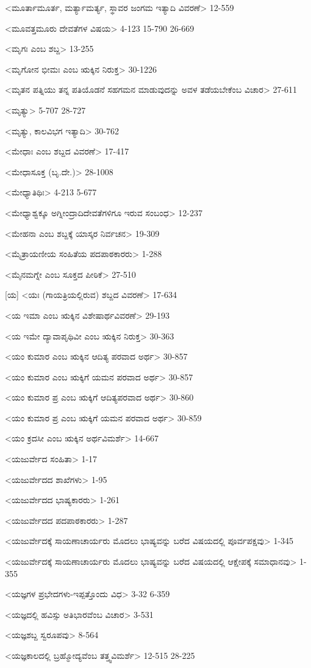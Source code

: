 <ಮೂರ್ತಾಮೂರ್ತ, ಮರ್ತ್ಯಾಮರ್ತ್ಯ, ಸ್ಥಾವರ ಜಂಗಮ ಇತ್ಯಾದಿ ವಿವರಣೆ>
12-559

<ಮೂವತ್ತಮೂರು ದೇವತೆಗಳ ವಿಷಯ>
4-123 
15-790
26-669

<ಮೃಗಃ ಎಂಬ ಶಬ್ದ>
13-255

<ಮೃಗೋನ ಭೀಮಃ ಎಂಬ ಋಕ್ಕಿನ ನಿರುಕ್ತ>
30-1226

<ಮೃತನ ಪತ್ನಿಯು ತನ್ನ ಪತಿಯೊಡನೆ ಸಹಗಮನ ಮಾಡುವುದನ್ನು ಅವಳ ತಡೆಯಬೇಕೆಂಬ ವಿಚಾರ>
27-611

<ಮೃತ್ಯು>
5-707
28-727

<ಮೃತ್ಯು, ಕಾಲವಿಭಗ ಇತ್ಯಾದಿ>
30-762

<ಮೇಧಾಃ ಎಂಬ ಶಬ್ದದ ವಿವರಣೆ>
17-417

<ಮೇಧಾಸೂಕ್ತ (ಬೃ.ದೇ.)>
28-1008

<ಮೇಧ್ಯಾತಿಥಿಃ>
4-213
5-677

<ಮೇಧ್ಯಾಶ್ವಕ್ಕೂ ಅಗ್ನೀಂದ್ರಾದಿದೇವತೆಗಳಿಗೂ ಇರುವ ಸಂಬಂಧ>
12-237


<ಮೇಹನಾ ಎಂಬ ಶಬ್ದಕ್ಕೆ ಯಾಸ್ಕರ ನಿರ್ವಚನ>
19-309

<ಮೈತ್ರಾಯಣೀಯ ಸಂಹಿತೆಯ ಪದಪಾಠಕಾರರು>
1-288

<ಮೈನಮಗ್ನೇ ಎಂಬ ಸೂಕ್ತದ ಪೀಠಿಕೆ>
27-510


[ಯ]
<ಯಃ (ಗಾಯತ್ರಿಯಲ್ಲಿರುವ) ಶಬ್ದದ ವಿವರಣೆ>
17-634

<ಯ ಇಮಾ ಎಂಬ ಋಕ್ಕಿನ ವಿಶೇಷಾರ್ಥವಿವರಣೆ>
29-193

<ಯ ಇಮೇ ದ್ಯಾವಾಪೃಥಿವೀ ಎಂಬ ಋಕ್ಕಿನ ನಿರುಕ್ತ>
30-363

<ಯಂ ಕುಮಾರ ಎಂಬ ಋಕ್ಕಿನ ಆದಿತ್ಯ ಪರವಾದ ಅರ್ಥ>
30-857

<ಯಂ ಕುಮಾರ ಎಂಬ ಋಕ್ಕಿಗೆ ಯಮನ ಪರವಾದ ಅರ್ಥ>
30-857

<ಯಂ ಕುಮಾರ ಪ್ರ ಎಂಬ ಋಕ್ಕಿಗೆ ಆದಿತ್ಯಪರವಾದ ಅರ್ಥ>
30-860

<ಯಂ ಕುಮಾರ ಪ್ರ ಎಂಬ ಋಕ್ಕಿಗೆ ಯಮನ ಪರವಾದ ಅರ್ಥ>
30-859

<ಯಂ ಕ್ರದಸೀ ಎಂಬ ಋಕ್ಕಿನ ಅರ್ಥವಿಮರ್ಶೆ>
14-667

<ಯಜುರ್ವೇದ ಸಂಹಿತಾ>
1-17

<ಯಜುರ್ವೇದದ ಶಾಖೆಗಳು>
1-95

<ಯಜುರ್ವೇದದ ಭಾಷ್ಯಕಾರರು>
1-261

<ಯಜುರ್ವೇದದ ಪದಪಾಠಕಾರರು>
1-287

<ಯಜುರ್ವೇದಕ್ಕೆ ಸಾಯಣಾಚಾರ್ಯರು ಮೊದಲು ಭಾಷ್ಯವನ್ನು ಬರೆದ ವಿಷಯದಲ್ಲಿ ಪೂರ್ವಪಕ್ಷವು>
1-345

<ಯಜುರ್ವೇದಕ್ಕೆ ಸಾಯಣಾಚಾರ್ಯರು ಮೊದಲು ಭಾಷ್ಯವನ್ನು ಬರೆದ ವಿಷಯದಲ್ಲಿ ಆಕ್ಷೇಪಕ್ಕೆ ಸಮಾಧಾನವು>
1-355

<ಯಜ್ಞಗಳ ಪ್ರಭೇದಗಳು-ಇಪ್ಪತ್ತೊಂದು ವಿಧ>
3-32
6-359

<ಯಜ್ಞದಲ್ಲಿ ಹವಿಸ್ಸು ಅತಿಭಾರವೆಂಬ ವಿಚಾರ>
3-531

<ಯಜ್ಞಶಬ್ದ ಸ್ವರೂಪವು>
8-564

<ಯಜ್ಞಕಾಲದಲ್ಲಿ ಬ್ರಹ್ಮೋದ್ಯವೆಂಬ ತತ್ತ್ವವಿಮರ್ಶೆ>
12-515
28-225

